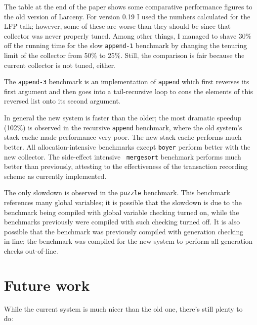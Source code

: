 The table at the end of the paper shows some comparative performance figures
to the old version of Larceny. For version 0.19 I used the numbers
calculated for the LFP talk; however, some of these are worse than they
should be since that collector was never properly tuned. Among other things,
I managed to shave 30\% off the running time for the slow {\tt append-1}
benchmark by changing the tenuring limit of the collector from 50\% to 25\%.
Still, the comparison is fair because the current collector is not tuned,
either.

The {\tt append-3} benchmark is an implementation of {\tt append} which first
reverses its first argument and then goes into a tail-recursive loop to cons
the elements of this reversed list onto its second argument.

In general the new system is faster than the older; the most dramatic
speedup (102\%) is observed in the recursive {\tt append} benchmark, where
the old system's stack cache made performance very poor. The new stack cache
performs much better. All allocation-intensive benchmarks except {\tt boyer}
perform better with the new collector. The side-effect intensive {\tt
mergesort} benchmark performs much better than previously, attesting to the
effectiveness of the transaction recording scheme as currently implemented.

The only slowdown is observed in the {\tt puzzle} benchmark. This benchmark
references many global variables; it is possible that the slowdown is due to
the benchmark being compiled with global variable checking turned on, while
the benchmarks previously were compiled with such checking turned off. It is
also possible that the benchmark was previously compiled with generation
checking in-line; the benchmark was compiled for the new system to perform
all generation checks out-of-line.

\section{Future work}

While the current system is much nicer than the old one, there's still
plenty to do:

